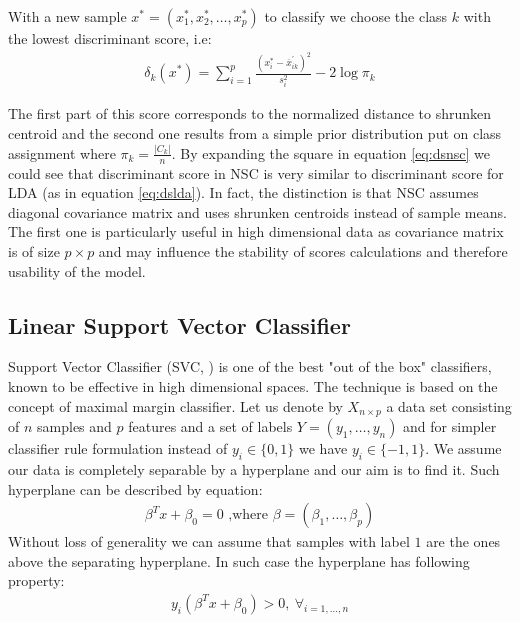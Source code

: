 \documentclass[shortabstract, english, mgr]{iithesis}
\begin{document}
With a new sample $x^{*}=\left(x_{1}^{*}, x_{2}^{*}, \ldots, x_{p}^{*}\right)$ to classify we choose the class $k$ with the lowest discriminant score, i.e:
\begin{align}
\delta_{k}\left(x^{*}\right)=\sum_{i=1}^{p}\frac{\left(x_{i}^{*}-\overline{x}_{ik}^{\prime}\right)^{2}}{s_{i}^{2}}-2 \log \pi_{k} \label{eq:dsnsc}
\end{align}

The first part of this score corresponds to the normalized distance to shrunken centroid and the second one results from a simple prior distribution put on class assignment where $\pi_{k} = \frac{|C_k|}{n}$. By expanding the square in equation \ref{eq:dsnsc} we could see that discriminant score in NSC is very similar to discriminant score for LDA (as in equation \ref{eq:dslda}). In fact, the distinction is that NSC assumes diagonal covariance matrix and uses shrunken centroids instead of sample means. The first one is particularly useful in high dimensional data as covariance matrix is of size $p \times p$ and may influence the stability of scores calculations and therefore usability of the model.

\subsection{Linear Support Vector Classifier}

Support Vector Classifier (SVC, \cite[chapter 9]{ISL}) is one of the best "out of the box" classifiers, known to be effective in high dimensional spaces. The technique is based on the concept of maximal margin classifier. Let us denote by $X_{n \times p}$ a data set consisting of $n$ samples and $p$ features and a set of labels $Y = (y_1, \ldots, y_n)$ and for simpler classifier rule formulation instead of $y_i \in \{0,1\}$ we have $y_i \in \{-1, 1\}$. We assume our data is completely separable by a hyperplane and our aim is to find it. Such hyperplane can be described by equation:
\begin{align*}
    \beta^T x + \beta_0 = 0 \text{ ,where $\beta = (\beta_1, \ldots, \beta_p)$}
\end{align*}
Without loss of generality we can assume that samples with label $1$ are the ones above the separating hyperplane. In such case the hyperplane has following property:
\begin{align*}
    y_i(\beta^T x + \beta_0) > 0, \ \forall_{i=1, \ldots, n}
\end{align*}
\end{document}
